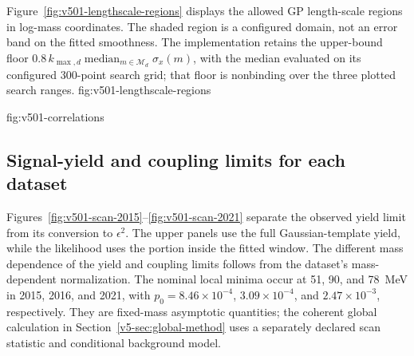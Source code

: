 
Figure~\ref{fig:v501-lengthscale-regions} displays the allowed GP length-scale
regions in log-mass coordinates. The shaded region is a configured domain, not
an error band on the fitted smoothness. The implementation retains the upper-bound
floor $0.8\,k_{\max,d}\operatorname{median}_{m\in\mathcal M_d}\sigma_x(m)$,
with the median evaluated on its configured 300-point search grid; that floor is
nonbinding over the three plotted search ranges.
{fig:v501-lengthscale-regions}

{fig:v501-correlations}

\subsection{Signal-yield and coupling limits for each dataset}
\label{sec:v501-individual-scans}
Figures~\ref{fig:v501-scan-2015}--\ref{fig:v501-scan-2021} separate the
observed yield limit from its conversion to $\epsilon^2$. The upper panels
use the full Gaussian-template yield, while the likelihood uses the portion
inside the fitted window. The different mass dependence of the yield and
coupling limits follows from the dataset's mass-dependent normalization.
The nominal local minima occur at 51, 90, and 78~MeV in 2015, 2016, and
2021, with $p_0=8.46\times10^{-4}$, $3.09\times10^{-4}$, and
$2.47\times10^{-3}$, respectively. They are fixed-mass asymptotic quantities;
the coherent global calculation in Section~\ref{v5-sec:global-method} uses
a separately declared scan statistic and conditional background model.

